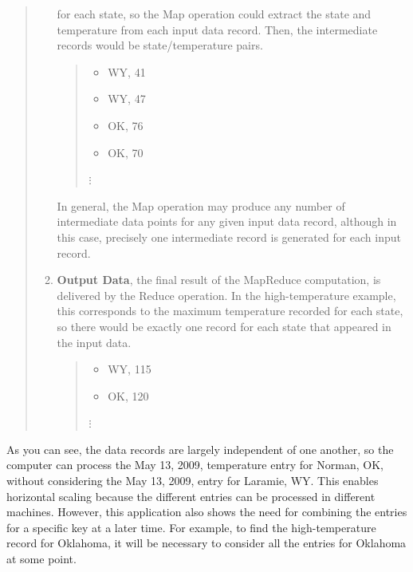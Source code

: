 \begin{quote}
\begin{enumerate}
        for each state, so the Map operation could extract
        the state and temperature from each input data record.
        Then, the intermediate records would be state/temperature pairs.
        \begin {quote}
        \begin{itemize}
            \item \textsf{WY, 41}
            \item \textsf{WY, 47}
            \item \textsf{OK, 76}
            \item \textsf{OK, 70}
        \end{itemize}
        \hspace*{1cm}$\vdots$
        \end{quote}
        In general, the Map operation may produce any number of intermediate
        data points for any given input data record, although in this case,
        precisely one intermediate record is generated for each input record.
    \item \textbf{Output Data}, the final result of the MapReduce computation,
        is delivered by the Reduce operation.
        In the high-temperature example, this
        corresponds to the maximum temperature recorded for each state, so
        there would be exactly one record for each state that appeared in the input data.
        \begin {quote}
        \begin{itemize}
            \item \textsf{WY, 115}
            \item \textsf{OK, 120}
        \end{itemize}
        \hspace*{1cm}$\vdots$
        \end{quote}
\end{enumerate}
\end{quote}
As you can see, the data records are largely independent of one another, so the computer
can process the May 13, 2009, temperature entry for Norman, OK, without considering the
May 13, 2009, entry for Laramie, WY.  This enables horizontal scaling because the
different entries can be processed in different machines.
However, this application also shows the need for combining
the entries for a specific key at a later time.  For example,
to find the high-temperature record for Oklahoma, it will be
necessary to consider all the entries for Oklahoma at some
point.

